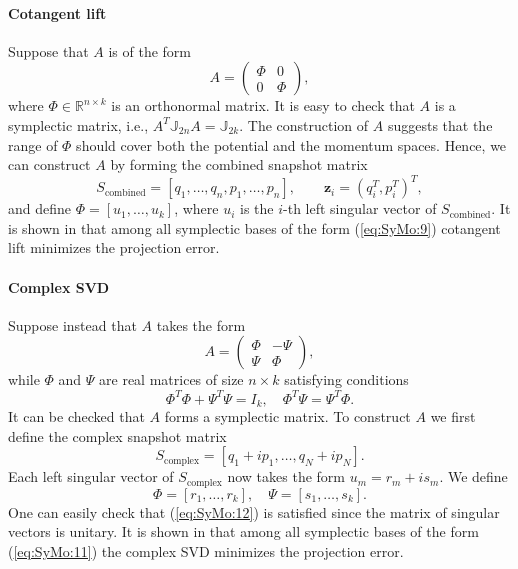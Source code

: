 \paragraph{\bf Cotangent lift} Suppose that $A$ is of the form
\begin{equation} \label{eq:SyMo:9}
	A = 
	\begin{pmatrix}
		\Phi & 0 \\
		0 & \Phi
	\end{pmatrix},
\end{equation}
where $\Phi \in \mathbb{R}^{n\times k}$ is an orthonormal matrix. It is easy to check that $A$ is a symplectic matrix, i.e., $A^T \mathbb J_{2n} A = \mathbb J_{2k}$. The construction of $A$ suggests that the range of $\Phi$ should cover both the potential and the momentum spaces. Hence, we can construct $A$ by forming the combined snapshot matrix
\begin{equation} \label{eq:SyMo:10}
	S_{\text{combined}} = [q_1,\dots,q_n,p_1,\dots,p_n], \qquad \mathbf z_i = (q_i^T,p_i^T)^T,
\end{equation}
and define $\Phi=[u_1,\dots,u_k]$, where $u_i$ is the $i$-th left singular vector of $S_{\text{combined}}$. It is shown in \cite{Peng:2014di} that among all symplectic bases of the form (\ref{eq:SyMo:9}) cotangent lift minimizes the projection error.


\paragraph{\bf Complex SVD} Suppose instead that $A$ takes the form \cite{Peng:2014di}
\begin{equation} \label{eq:SyMo:11}
	A = 
	\begin{pmatrix}
		\Phi & -\Psi \\
		\Psi & \Phi
	\end{pmatrix},
\end{equation}
while $\Phi$ and $\Psi$ are real matrices of size $n\times k$ satisfying conditions
\begin{equation} \label{eq:SyMo:12}
\Phi^T \Phi + \Psi^T \Psi = I_k,\quad \Phi^T \Psi = \Psi^T \Phi.
\end{equation}
It can be checked that $A$ forms a symplectic matrix. To construct $A$ we first define the complex snapshot matrix
\begin{equation} \label{eq:SyMo:13}
	S_{\text{complex}} = [ q_1 + i p_1, \dots , q_N + i p_N ].
\end{equation}
Each left singular vector of $S_{\text{complex}}$ now takes the form $u_m = r_m + i s_m$. We define
\begin{equation} \label{eq:SyMo:14}
	 \Phi = [r_1,\dots, r_k], \quad \Psi = [s_1,\dots, s_k].
\end{equation}
One can easily check that (\ref{eq:SyMo:12}) is satisfied {\edit since the matrix of singular vectors is unitary}. It is shown in \cite{Peng:2014di} that among all symplectic bases of the form (\ref{eq:SyMo:11}) the complex SVD minimizes the projection error.

